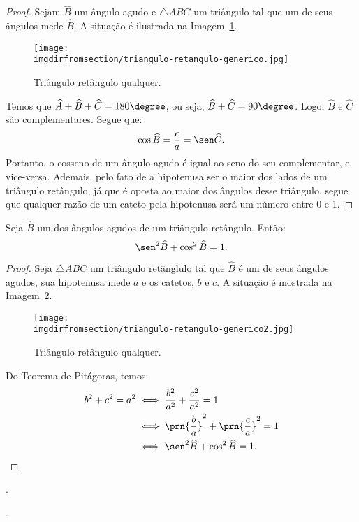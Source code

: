\begin{proof}
	Sejam $\widehat B$ um ângulo agudo e $\triangle ABC$ um triângulo tal que um de seus ângulos mede $\widehat B$.
	A situação é ilustrada na Imagem~\ref{img:triangulo-retangulo-generico}.
	\begin{figure}[H]
		\centering
		\texttt{[image: \\imgdirfromsection/triangulo-retangulo-generico.jpg]}
		\caption{Triângulo retângulo qualquer.}
		\label{img:triangulo-retangulo-generico}
	\end{figure}
	Temos que $\widehat A + \widehat B  + \widehat C = 180\degree$, ou seja, $\widehat B  + \widehat C = 90\degree$.
	Logo, $\widehat B$ e $\widehat C$ são complementares. Segue que:
	$$\cos \widehat B = \frac c a = \sen \widehat C.$$ Portanto, o cosseno de um ângulo agudo é igual ao seno do seu complementar,
	e vice-versa. Ademais, pelo fato de a hipotenusa ser o maior dos lados de um triângulo retângulo, já que é oposta ao 
	maior dos ângulos desse triângulo, segue que qualquer razão de um cateto pela hipotenusa será um número entre 0 e 1.
\end{proof}

\begin{proposition}
Seja $\widehat B$ um dos ângulos agudos de um triângulo retângulo. Então:
$$\sen^2 \widehat B + \cos^2 \widehat B = 1.$$
\end{proposition}

\begin{proof}
	Seja $\triangle ABC$ um triângulo retânglulo tal que $\widehat B$ é um de seus ângulos agudos, sua hipotenusa mede $a$ e os catetos, $b$ e $c$. A situação é mostrada na Imagem~\ref{img:prova-relacao-fundamental-trigonometria}.
	\begin{figure}[H]
		\centering
		\texttt{[image: \\imgdirfromsection/triangulo-retangulo-generico2.jpg]}
		\caption{Triângulo retângulo qualquer.}
		\label{img:prova-relacao-fundamental-trigonometria}
	\end{figure}
	Do Teorema de Pitágoras, temos:
	\begin{align*}
		b^2 + c^2 = a^2 &\iff \frac{b^2}{a^2} + \frac{c^2}{a^2} = 1 \\ &\iff \prn{\frac b a}^2 + \prn{\frac c a}^2 = 1 \\ 
		&\iff \sen^2 \widehat B  +  \cos^2 \widehat B= 1.
	\end{align*}
\end{proof}

\begin{onlineact}
	.
\end{onlineact}

\begin{onlineact}
	.
\end{onlineact}